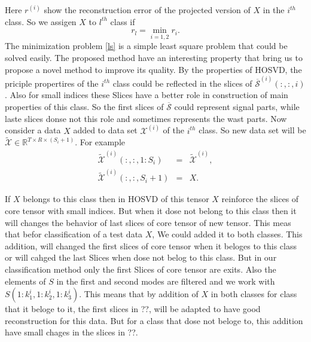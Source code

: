 \documentclass[journal]{IEEEtran}
\begin{document}
Here $r^{(i)}$ show the  reconstruction error of the projected version of $X$ in the $i^{th}$ class. So we assigen $X$ to $l^{th}$ class if 
\[
r_{l}=\min_{i=1,2} {r_{i}}.
\]
The minimization problem \eqref{ls} is a simple least square problem that could be solved easily.
The proposed method have an interesting property that  bring us to propose a novel method to improve its 
quality.
By the properties of HOSVD, the priciple propertires of the $i^{th}$ class could be reflected in the  slices of
$\overline{\mathcal{S}}^{(i)}(:,:,i)$. Also for small indices these Slices have a  better   role in construction of main properties of this class. So the first slices of $\overline{\mathcal{S}}$
could represent signal parts, while laste slices donse not this role and sometimes represents the wast parts.
Now consider a data $X$ added to data set $\mathcal{X}^{(i)}$ of the $i^{th}$ class. So new data set will be
$\mathcal{\widetilde{X}}\in \mathbb{R}^{T\times R \times (S_{i}+1)}$. For example
\begin{eqnarray*}
	\widetilde{\mathcal{X}}^{(i)}(:,:,1:S_i)&=&\widetilde{\mathcal{X}}^{(i)},\\
	\widetilde{\mathcal{X}}^{(i)}(:,:,S_i+1)&=&X.
\end{eqnarray*}

If $X$ belongs to this class then in HOSVD of this tensor $X$ reinforce the slices of core tensor with small indices. But when it  dose not belong to this class then it  will changes the behavior of last slices of core tensor of new tensor. This meas that befor classification of a test data $X$, We could added it to both classes. This addition,  will changed the first slices of core tensor when it beloges to this  class or
will cahged the last Slices  when dose not belog to this class. But in our classification method only the first Slices of core tensor are exits. Also the elements of $S$ in the first and second modes are filtered and we work with $S(1:k_1^i,1:k_2^i,1:k_3^i)$.  This means that by addition of $X$ in both classes for class that it beloge to it, the first slices in ??, will be  adapted to have good reconstruction for this data. But for a class that dose not beloge to, this addition have small chages in the slices in ??.
\end{document}
